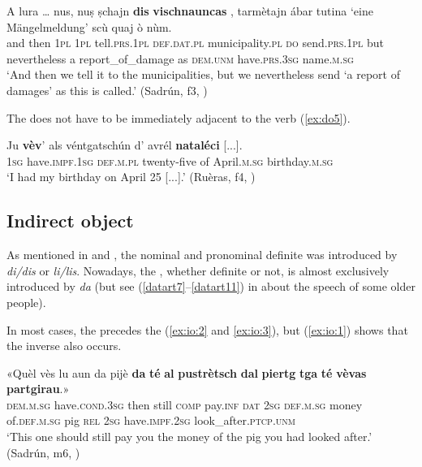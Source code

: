 \ea\label{ex:noobj3}
\gll  A lura … nus, nuṣ ṣchajn {\ob}\textbf{dis} \textbf{vischnauncas}{\cb} {\ob}\textbf{{\longrule}}{\cb}, tarmètajn ábar tutina `eine Mängelmeldung'\footnotemark{} scù quaj ò nùm.  \\
and then {} \textsc{1pl} \textsc{1pl} tell.\textsc{prs.1pl} \textsc{def.dat.pl} municipality.\textsc{pl} \textsc{do} send.\textsc{prs.1pl} but nevertheless a report\_of\_damage as \textsc{dem.unm} have.\textsc{prs.3sg} name.\textsc{m.sg}\\
\glt `And then we tell it to the municipalities, but we nevertheless send `a report of damages' as this is called.' (Sadrún, f3, )
\z

The  does not have to be immediately adjacent to the verb (\ref{ex:do5}).

\ea
\label{ex:do5}
	\gll Ju \textbf{vèv}’ als véntgatschún d’ avrél \textbf{nataléci} [...].   \\
\textsc{1sg} have.\textsc{impf.1sg} \textsc{def.m.pl} twenty-five of April.\textsc{m.sg} birthday.\textsc{m.sg} \\
\glt `I had my birthday on April 25 [...].' (Ruèras, f4, )
\z


\subsection{Indirect object}\label{sec:4.2.3}
As mentioned in  and , the nominal and pronominal definite  was introduced by \textit{di/dis} or \textit{li/lis}. Nowadays, the , whether definite or not, is almost exclusively introduced by \textit{da} (but see (\ref{datart7}--\ref{datart11}) in  about the speech of some older people).

In most cases, the  precedes the  (\ref{ex:io:2} and \ref{ex:io:3}), but (\ref{ex:io:1}) shows that the inverse also occurs.
 
\ea\label{ex:io:2}
\gll  «Quèl vès lu aun da pijè {\ob}\textbf{da} \textbf{té}{\cb} {\ob}\textbf{al} \textbf{pustrètsch} \textbf{dal} \textbf{piertg} \textbf{tga} \textbf{té} \textbf{vèvas} \textbf{partgirau}{\cb}.» \\
\textsc{dem.m.sg} have.\textsc{cond.3sg} then still \textsc{comp} pay.\textsc{inf} \textsc{dat} \textsc{2sg} \textsc{def.m.sg} money of.\textsc{def.m.sg} pig \textsc{rel} \textsc{2sg} have.\textsc{impf.2sg} look\_after.\textsc{ptcp.unm}\\
\glt `This one should still pay you the money of the pig you had looked after.' (Sadrún, m6, )
\z


